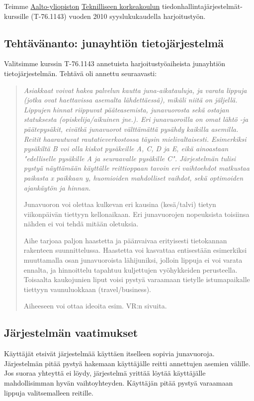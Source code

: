 \documentclass[a4paper,twoside,titlepage,12pt]{article}
\begin{document}
Teimme \href{http://www.aalto.fi/}{Aalto-yliopiston} \href{http://www.tkk.fi/}{Teknilliseen korkeakoulun} tiedonhallintajärjestelmät-kurssille (T-76.1143) vuoden 2010 syyslukukaudella harjoitustyön.



\subsection{Tehtävänanto: junayhtiön tietojärjestelmä}

Valitsimme kurssin T-76.1143 annetuista harjoitustyöaiheista junayhtiön tietojärjestelmän. Tehtävä oli annettu seuraavasti:

\begin{quotation}
\itshape
Asiakkaat voivat hakea palvelun kautta juna-aikatauluja, ja varata lippuja (jotka ovat haettavissa asemalta lähdettäessä), mikäli niitä on jäljellä. Lippujen hinnat riippuvat pääteasemista, junavuorosta sekä ostajan statuksesta (opiskelija/aikuinen jne.). Eri junavuoroilla on omat lähtö -ja päätepysäkit, eivätkä junavuorot välttämättä pysähdy kaikilla asemilla. Reitit haarautuvat rautatieverkostossa täysin mielivaltaisesti. Esimerkiksi pysäkiltä B voi olla kiskot pysäkeille A, C, D ja E, eikä ainoastaan "edelliselle pysäkille A ja seuraavalle pysäkille C". Järjestelmän tulisi pystyä näyttämään käyttälle reittioppaan tavoin eri vaihtoehdot matkustaa paikasta x paikkaan y, huomioiden mahdolliset vaihdot, sekä optimoiden ajankäytön ja hinnan.

Junavuoron voi olettaa kulkevan eri kausina (kesä/talvi) tietyn viikonpäivän tiettyyn kellonaikaan. Eri junavuorojen nopeuksista toisiinsa nähden ei voi tehdä mitään oletuksia.

Aihe tarjoaa paljon haastetta ja päänvaivaa erityisesti tietokannan rakenteen suunnittelussa. Haastetta voi kasvattaa entisestään esimerkiksi muuttamalla osan junavuoroista lähijuniksi, jolloin lippuja ei voi varata ennalta, ja hinnoittelu tapahtuu kuljettujen vyöhykkeiden perusteella. Toisaalta kaukojunien liput voisi pystyä varaamaan tietylle istumapaikalle tiettyyn vaunuluokkaan (travel/business).

Aiheeseen voi ottaa ideoita esim. VR:n sivuita.
\end{quotation}

\subsection{Järjestelmän vaatimukset}
Käyttäjät etsivät järjestelmää käyttäen itselleen sopivia junavuoroja.
Järjestelmän pitää pystyä hakemaan käyttäjälle reitti annettujen asemien
välille. Jos suoraa yhteyttä ei löydy, järjestelmä yrittää löytää käyttäjälle
mahdollisimman hyvän vaihtoyhteyden. Käyttäjän pitää pystyä varaamaan lippuja
valitsemalleen reitille.
\end{document}
